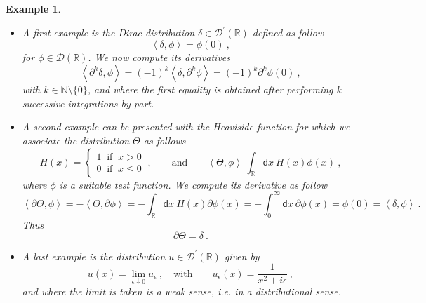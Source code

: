 \documentclass[11pt]{book}
\newcommand{\sm}[1]{\left\langle#1\right\rangle}
\newcommand{\Dcal}{\mathcal{D}}
\newcommand{\Nbb}{\mathbb{N}}
\newcommand{\Rbb}{\mathbb{R}}
\newcommand{\dsf}{\mathsf{d}}
\theoremstyle{break}
\newtheorem{example}{Example}[chapter]
\begin{document}
\begin{example}
\begin{itemize}

\item A first example is the Dirac distribution $\delta \in \Dcal^\prime(\Rbb)$ defined as follow
%
\begin{equation*}
\sm{\delta , \phi} = \phi(0) \ , 
\end{equation*}
%
for $\phi \in \Dcal(\Rbb)$. We now compute its derivatives
%
\begin{equation*}
\sm{\partial^k \delta , \phi} = (-1)^k \sm{\delta , \partial^k \phi} =  (-1)^k \partial^k \phi(0) \ ,
\end{equation*}
%
with $k \in \Nbb \setminus \{0\}$, and where the first equality is obtained after performing $k$ successive integrations by part. 


\item A second example can be presented with the Heaviside function for which we associate the distribution $\Theta$ as follows
%
\begin{equation*}
H(x) = \left\{
\begin{array}{l}
1 \ \mbox{ if } \ x > 0 \\
0 \ \mbox{ if } \ x \leq 0
\end{array}
\right. \ , \qquad \mbox{and} \qquad \sm{\Theta,\phi} \ \int_\Rbb \dsf x \ H(x) \phi(x) \ ,
\end{equation*}
%
where $\phi$ is a suitable test function. We compute its derivative as follow
%
\begin{equation*}
\sm{\partial \Theta , \phi} = - \sm{\Theta , \partial \phi} = - \int_\Rbb \dsf x \ H(x) \partial \phi(x) = - \int_0^\infty \dsf x \ \partial \phi(x) = \phi(0) = \sm{\delta , \phi} \ .
\end{equation*}
%
Thus
%
\begin{equation*}
\partial \Theta = \delta \ . 
\end{equation*}


\item A last example is the distribution $u \in \Dcal^\prime(\Rbb)$ given by
%
\begin{equation*}
u(x) = \lim_{\epsilon \downarrow 0} u_\epsilon \ , \quad \mbox{with} \qquad u_\epsilon(x) = \frac{1}{x^2 + i \epsilon} \ ,
\end{equation*}
%
and where the limit is taken is a weak sense, i.e. in a distributional sense.

\end{itemize}
\end{example}
\end{document}
